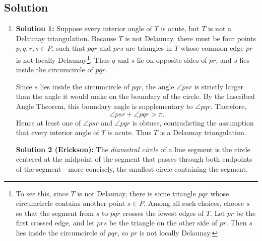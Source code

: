 \documentclass{article}
\begin{document}
\subsection*{Solution}
    \begin{enumerate}
        \item \textbf{Solution 1:} Suppose every interior angle of \( T \) is acute, but $T$ is not a Delaunay triangulation. Because \( T \) is not Delaunay, there must be four points \( p, q, r, s \in P \), such that \( pqr \) and \( prs \) are triangles in \( T \) whose common edge \( pr \) is not locally Delaunay\footnote{To see this, since \(T\) is not Delaunay, there is some triangle \(pqr\) whose circumcircle contains another point \(s \in P\). Among all such choices, choose \(s\) so that the segment from \(s\) to \(pqr\) crosses the fewest edges of \(T\). Let \(pr\) be the first crossed edge, and let \(prs\) be the triangle on the other side of \(pr\). Then \(s\) lies inside the circumcircle of \(pqr\), so \(pr\) is not locally Delaunay.}. Thus $q$ and $s$ lie on opposite sides of $pr$, and $s$ lies inside the circumcircle of $pqr$.

        \vspace{3mm}
        Since $s$ lies inside the circumcircle of $pqr$, the angle $\angle psr$ is strictly larger than the angle it would make on the boundary of the circle. By the Inscribed Angle Theorem, this boundary angle is supplementary to $\angle pqr$. Therefore,
        $$\angle psr + \angle pqr > \pi.$$
        Hence at least one of $\angle psr$ and $\angle pqr$ is obtuse, contradicting the assumption that every interior angle of $T$ is acute. Thus $T$ is a Delaunay triangulation.

    \begin{tcolorbox}[colback=ForestGreen!2, colframe=ForestGreen!20]
        \textbf{Solution 2 (Erickson):} The \textit{diametral circle} of a line segment is the circle centered at the midpoint of the segment that passes through both endpoints of the segment---more concisely, the smallest circle containing the segment.
    

\end{tcolorbox}
\end{enumerate}
\end{document}
